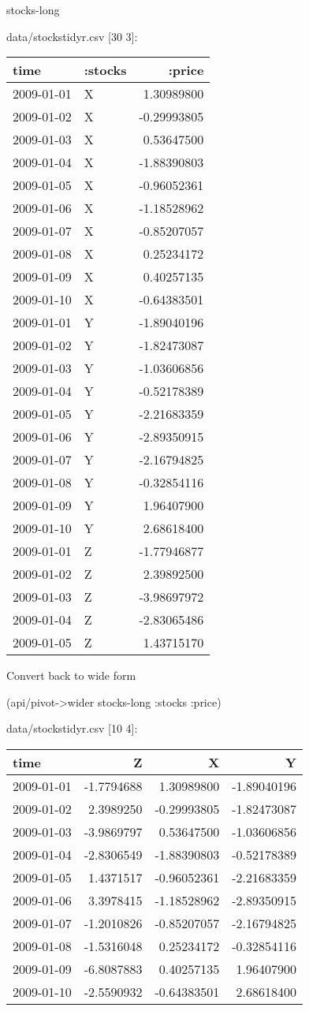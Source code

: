 \documentclass[]{article}
\newenvironment{Shaded}{\begin{snugshade}}{\end{snugshade}}
\newcommand{\AttributeTok}[1]{\textcolor[rgb]{0.77,0.63,0.00}{#1}}
\newcommand{\NormalTok}[1]{#1}
\begin{document}
\begin{Shaded}
\begin{Highlighting}[]
\NormalTok{stocks-long}
\end{Highlighting}
\end{Shaded}

data/stockstidyr.csv {[}30 3{]}:

\begin{longtable}[]{@{}llr@{}}
\toprule
time & :stocks & :price\tabularnewline
\midrule
\endhead
2009-01-01 & X & 1.30989800\tabularnewline
2009-01-02 & X & -0.29993805\tabularnewline
2009-01-03 & X & 0.53647500\tabularnewline
2009-01-04 & X & -1.88390803\tabularnewline
2009-01-05 & X & -0.96052361\tabularnewline
2009-01-06 & X & -1.18528962\tabularnewline
2009-01-07 & X & -0.85207057\tabularnewline
2009-01-08 & X & 0.25234172\tabularnewline
2009-01-09 & X & 0.40257135\tabularnewline
2009-01-10 & X & -0.64383501\tabularnewline
2009-01-01 & Y & -1.89040196\tabularnewline
2009-01-02 & Y & -1.82473087\tabularnewline
2009-01-03 & Y & -1.03606856\tabularnewline
2009-01-04 & Y & -0.52178389\tabularnewline
2009-01-05 & Y & -2.21683359\tabularnewline
2009-01-06 & Y & -2.89350915\tabularnewline
2009-01-07 & Y & -2.16794825\tabularnewline
2009-01-08 & Y & -0.32854116\tabularnewline
2009-01-09 & Y & 1.96407900\tabularnewline
2009-01-10 & Y & 2.68618400\tabularnewline
2009-01-01 & Z & -1.77946877\tabularnewline
2009-01-02 & Z & 2.39892500\tabularnewline
2009-01-03 & Z & -3.98697972\tabularnewline
2009-01-04 & Z & -2.83065486\tabularnewline
2009-01-05 & Z & 1.43715170\tabularnewline
\bottomrule
\end{longtable}

Convert back to wide form

\begin{Shaded}
\begin{Highlighting}[]
\NormalTok{(api/pivot->wider stocks-long }\AttributeTok{:stocks} \AttributeTok{:price}\NormalTok{)}
\end{Highlighting}
\end{Shaded}

data/stockstidyr.csv {[}10 4{]}:

\begin{longtable}[]{@{}lrrr@{}}
\toprule
time & Z & X & Y\tabularnewline
\midrule
\endhead
2009-01-01 & -1.7794688 & 1.30989800 & -1.89040196\tabularnewline
2009-01-02 & 2.3989250 & -0.29993805 & -1.82473087\tabularnewline
2009-01-03 & -3.9869797 & 0.53647500 & -1.03606856\tabularnewline
2009-01-04 & -2.8306549 & -1.88390803 & -0.52178389\tabularnewline
2009-01-05 & 1.4371517 & -0.96052361 & -2.21683359\tabularnewline
2009-01-06 & 3.3978415 & -1.18528962 & -2.89350915\tabularnewline
2009-01-07 & -1.2010826 & -0.85207057 & -2.16794825\tabularnewline
2009-01-08 & -1.5316048 & 0.25234172 & -0.32854116\tabularnewline
2009-01-09 & -6.8087883 & 0.40257135 & 1.96407900\tabularnewline
2009-01-10 & -2.5590932 & -0.64383501 & 2.68618400\tabularnewline
\bottomrule
\end{longtable}
\end{document}
